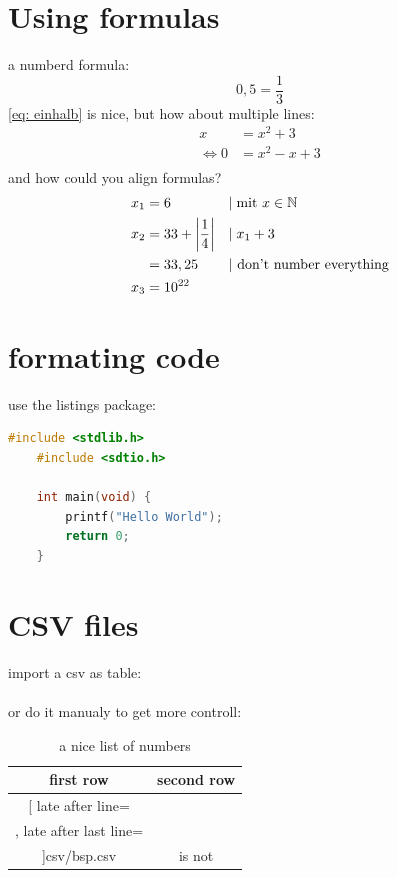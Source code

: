 \documentclass[	%
		11pt,a4paper,	%
		twoside,		%
		english,		%
		f1				%
	]{HsH-report}		%
\begin{document}
\section{Using formulas}
	\label{sec: formula}
	a numberd formula:
	\begin{equation}
		\label{eq: einhalb} %
		0,5=\frac{1}{3}
	\end{equation}
	\autoref{eq: einhalb} is nice, but how about multiple lines:
	\begin{equation}
	\begin{split} %
		x &= x^2+3 \\
		\Leftrightarrow 0 &= x^2-x+3 \\
	\end{split}
	\end{equation}
	and how could you align formulas?
	\begin{align}
		x_1 &= 6 &&|\;\mbox{mit } x \in \mathbb{N} \\
		x_2 &= 33+\left\vert\frac{1}{4}\right\vert &&|\;x_1+3 \\
			&= 33,25 &&\mbox{| don't number everything} \notag \\
		x_3 &= 10^{22}
	\end{align}

\section{formating code}
	\label{sec: code}
	use the listings package:
	\begin{lstlisting}[language=c]
	#include <stdlib.h>
	#include <sdtio.h>

	int main(void) {
		printf("Hello World");
		return 0;
	}
	\end{lstlisting}

\section{CSV files}
	\label{sec: messwerte}
	import a csv as table:\\
	\\
	or do it manualy to get more controll:
	\begin{table}
		\caption{a nice list of numbers}
		\begin{tabular}{c|c}
			first row & second row \\\hline\hline
			\csvreader[
				late after line=\\\hline,
				late after last line=\\\hline
			]{csv/bsp.csv}{}{number: $\csvcoli\,\metre$ & is not \csvcoliii}
		\end{tabular}
	\end{table}
\end{document}
